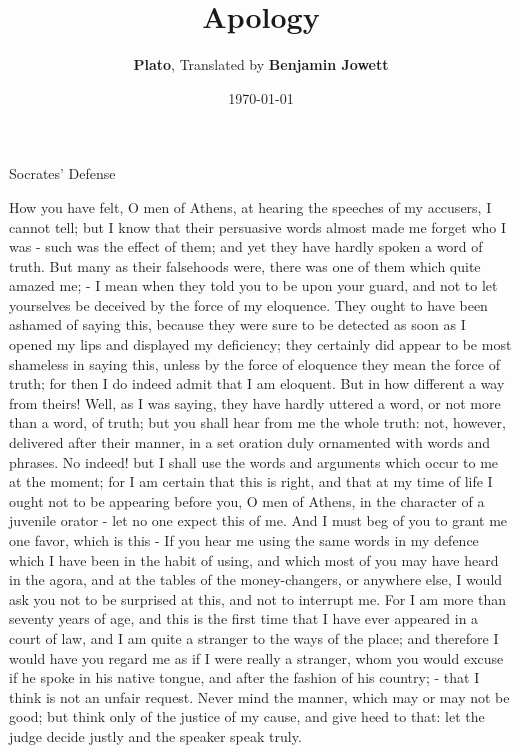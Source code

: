 \documentclass[11pt]{article}
\title{\textbf{Apology}}
\author{
  \textbf{Plato}, Translated by \textbf{Benjamin Jowett}
}
\date{\today}
\begin{document}
\maketitle

Socrates' Defense

How you have felt, O men of Athens, at hearing the speeches of my accusers, I cannot tell; but I know that their persuasive words almost made me forget who I was - such was the effect of them; and yet they have hardly spoken a word of truth. But many as their falsehoods were, there was one of them which quite amazed me; - I mean when they told you to be upon your guard, and not to let yourselves be deceived by the force of my eloquence. They ought to have been ashamed of saying this, because they were sure to be detected as soon as I opened my lips and displayed my deficiency; they certainly did appear to be most shameless in saying this, unless by the force of eloquence they mean the force of truth; for then I do indeed admit that I am eloquent. But in how different a way from theirs! Well, as I was saying, they have hardly uttered a word, or not more than a word, of truth; but you shall hear from me the whole truth: not, however, delivered after their manner, in a set oration duly ornamented with words and phrases. No indeed! but I shall use the words and arguments which occur to me at the moment; for I am certain that this is right, and that at my time of life I ought not to be appearing before you, O men of Athens, in the character of a juvenile orator - let no one expect this of me. And I must beg of you to grant me one favor, which is this - If you hear me using the same words in my defence which I have been in the habit of using, and which most of you may have heard in the agora, and at the tables of the money-changers, or anywhere else, I would ask you not to be surprised at this, and not to interrupt me. For I am more than seventy years of age, and this is the first time that I have ever appeared in a court of law, and I am quite a stranger to the ways of the place; and therefore I would have you regard me as if I were really a stranger, whom you would excuse if he spoke in his native tongue, and after the fashion of his country; - that I think is not an unfair request. Never mind the manner, which may or may not be good; but think only of the justice of my cause, and give heed to that: let the judge decide justly and the speaker speak truly.
\end{document}
